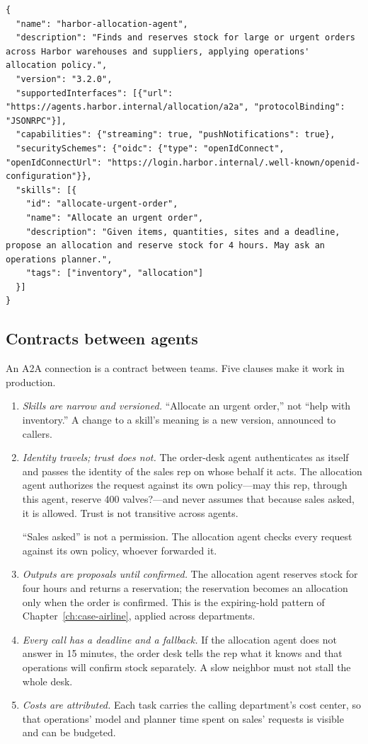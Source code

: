 \begin{lstlisting}[language={}, caption={The allocation agent's card (abridged).}, label={lst:agent-card}]
{
  "name": "harbor-allocation-agent",
  "description": "Finds and reserves stock for large or urgent orders across Harbor warehouses and suppliers, applying operations' allocation policy.",
  "version": "3.2.0",
  "supportedInterfaces": [{"url": "https://agents.harbor.internal/allocation/a2a", "protocolBinding": "JSONRPC"}],
  "capabilities": {"streaming": true, "pushNotifications": true},
  "securitySchemes": {"oidc": {"type": "openIdConnect", "openIdConnectUrl": "https://login.harbor.internal/.well-known/openid-configuration"}},
  "skills": [{
    "id": "allocate-urgent-order",
    "name": "Allocate an urgent order",
    "description": "Given items, quantities, sites and a deadline, propose an allocation and reserve stock for 4 hours. May ask an operations planner.",
    "tags": ["inventory", "allocation"]
  }]
}
\end{lstlisting}

\subsection{Contracts between agents}

An A2A connection is a contract between teams. Five clauses make it work in production.
\begin{enumerate}[itemsep=2pt]
  \item \emph{Skills are narrow and versioned.} ``Allocate an urgent order,'' not ``help with inventory.'' A change to a skill's meaning is a new version, announced to callers.
  \item \emph{Identity travels; trust does not.} The order-desk agent authenticates as itself and passes the identity of the sales rep on whose behalf it acts. The allocation agent authorizes the request against its own policy---may this rep, through this agent, reserve 400 valves?---and never assumes that because sales asked, it is allowed. Trust is not transitive across agents.

\begin{watchout}
``Sales asked'' is not a permission. The allocation agent checks every request against its own policy, whoever forwarded it.
\end{watchout}
  \item \emph{Outputs are proposals until confirmed.} The allocation agent reserves stock for four hours and returns a reservation; the reservation becomes an allocation only when the order is confirmed. This is the expiring-hold pattern of Chapter~\ref{ch:case-airline}, applied across departments.
  \item \emph{Every call has a deadline and a fallback.} If the allocation agent does not answer in 15 minutes, the order desk tells the rep what it knows and that operations will confirm stock separately. A slow neighbor must not stall the whole desk.
  \item \emph{Costs are attributed.} Each task carries the calling department's cost center, so that operations' model and planner time spent on sales' requests is visible and can be budgeted.
\end{enumerate}


